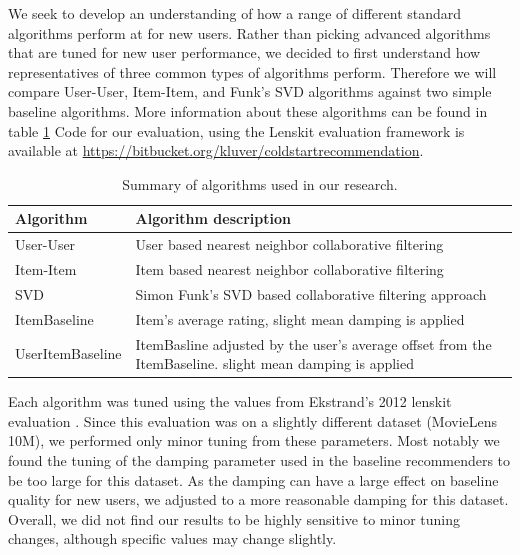 \documentclass[letterpaper]{sig-alternate}
\begin{document}
  We seek to develop an understanding of how a range of different standard algorithms perform at for new users.
  Rather than picking advanced algorithms that are tuned for new user performance, we decided to first understand how representatives of three common types of algorithms perform.
  Therefore we will compare User-User, Item-Item, and Funk's SVD algorithms against two simple baseline algorithms.
  More information about these algorithms can be found in table \ref{tbl:algo}
  Code for our evaluation, using the Lenskit evaluation framework \cite{lenskit} is available at \url{https://bitbucket.org/kluver/coldstartrecommendation}.
  
  \begin{table}
    \centering
    \begin{tabular}{|p{6em}|p{18em}|}
      \hline
      Algorithm        & Algorithm description                                                                                     \\\hline
      User-User        & User based nearest neighbor collaborative filtering \cite{resnick1994grouplens}                           \\\hline
      Item-Item        & Item based nearest neighbor collaborative filtering \cite{sarwar2001item}                                 \\\hline
      SVD              & Simon Funk's SVD based collaborative filtering approach \cite{funk_netflix_2006}                          \\\hline
      ItemBaseline     & Item's average rating, slight mean damping is applied                                                     \\\hline
      UserItem\-Baseline & ItemBasline adjusted by the user's average offset from the ItemBaseline. slight mean damping is applied \\\hline
    \end{tabular}
    \caption{Summary of algorithms used in our research.}
    \label{tbl:algo}
  \end{table}


  Each algorithm was tuned using the values from Ekstrand's 2012 lenskit evaluation \cite{ekstrand2012recommenders}.
  Since this evaluation was on a slightly different dataset (MovieLens 10M), we performed only minor tuning from these parameters.
  Most notably we found the tuning of the damping parameter used in the baseline recommenders to be too large for this dataset.
  As the damping can have a large effect on baseline quality for new users, we adjusted to a more reasonable damping for this dataset.
  Overall, we did not find our results to be highly sensitive to minor tuning changes, although specific values may change slightly.
\end{document}
